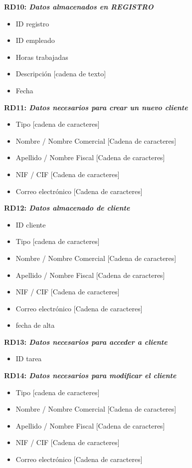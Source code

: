 \documentclass[paper=a4, fontsize=11pt, spanish]{scrartcl}
\begin{document}
\setlength{\parindent}{0em}
\textbf{RD10: \textit{Datos almacenados en REGISTRO}}
\setlength{\parindent}{2em}
\begin{itemize}
\item ID registro
\item ID empleado
\item Horas trabajadas
\item Descripción [cadena de texto]
\item Fecha
\end{itemize}

\setlength{\parindent}{0em}
\textbf{RD11: \textit{ Datos necesarios para crear un nuevo cliente}}
\setlength{\parindent}{2em}
\begin{itemize}
\item Tipo [cadena de caracteres]
\item Nombre / Nombre Comercial [Cadena de caracteres]
\item Apellido / Nombre Fiscal [Cadena de caracteres]
\item NIF / CIF [Cadena de caracteres]
\item Correo electrónico [Cadena de caracteres]
\end{itemize}

\setlength{\parindent}{0em}
\textbf{RD12: \textit{Datos almacenado de cliente}}
\setlength{\parindent}{2em}
\begin{itemize}
\item ID cliente
\item Tipo [cadena de caracteres]
\item Nombre / Nombre Comercial [Cadena de caracteres]
\item Apellido / Nombre Fiscal [Cadena de caracteres]
\item NIF / CIF [Cadena de caracteres]
\item Correo electrónico [Cadena de caracteres]
\item fecha de alta
\end{itemize}

\setlength{\parindent}{0em}
\textbf{RD13: \textit{Datos necesarios para acceder a cliente}}
\setlength{\parindent}{2em}
\begin{itemize}
\item ID tarea
\end{itemize}

\setlength{\parindent}{0em}
\textbf{RD14: \textit{Datos necesarios para modificar el cliente}}
\setlength{\parindent}{2em}
\begin{itemize}
\item Tipo [cadena de caracteres]
\item Nombre / Nombre Comercial [Cadena de caracteres]
\item Apellido / Nombre Fiscal [Cadena de caracteres]
\item NIF / CIF [Cadena de caracteres]
\item Correo electrónico [Cadena de caracteres]
\end{itemize}
\end{document}
